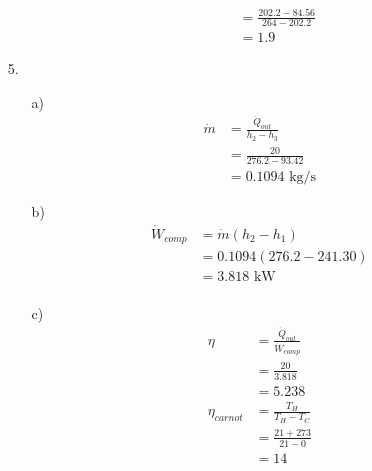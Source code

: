 \documentclass{article}
\begin{document}
\begin{itemize}
\begin{itemize}
\begin{itemize}
\begin{align*}
                &=\frac{202.2-84.56}{264-202.2}\\
                &=1.9
            \end{align*}
        \end{itemize}
    \end{itemize}
    \item [5.]
    \begin{itemize}
        \item [a)]
        \begin{align*}
            \dot m&= \frac{\dot Q_{out}}{h_2-h_3}\\
            &=\frac{20}{276.2-93.42}\\
            &=0.1094 \text{ kg/s}
        \end{align*}
        \item [b)]
        \begin{align*}
            \dot{W}_{comp}&=\dot m(h_2-h_1)\\
            &=0.1094(276.2-241.30)\\
            &=3.818 \text{ kW}\\           
        \end{align*}
        \item [c)]
        \begin{align*}
            \eta &=\frac{\dot Q_{out}}{\dot W_{comp}}\\
            &=\frac{20}{3.818}\\
            &=5.238\\
            \eta_{carnot}&=\frac{T_{H}}{T_{H}-T_{C}}\\
            &=\frac{21+273}{21-0}\\
            &=14
        \end{align*}
    \end{itemize}
\end{itemize}     
\end{document}
